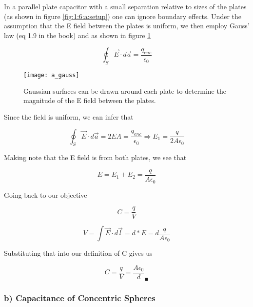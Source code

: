 In a parallel plate capacitor with a small separation relative to
sizes of the plates (as shown in figure \ref{fig:1:6:a:setup}) one can
ignore boundary effects.  Under the assumption that the E field
between the plates is uniform, we then employ Gauss' law (eq 1.9 in
the book) and as shown in figure \ref{fig:1:6:a:gauss}

\begin{equation}
  \oint_S \vec{E} \cdot d\vec{a} = \frac{q_{enc}}{\epsilon_0}
\end{equation}

\begin{figure}
  \begin{center}
    \texttt{[image: a\_gauss]}
    \caption{Gaussian surfaces can be drawn around each plate to
      determine the magnitude of the E field between the plates.}
    \label{fig:1:6:a:gauss}
  \end{center}
\end{figure}

Since the field is uniform, we can infer that

\begin{equation}
  \oint_S \vec{E} \cdot d\vec{a}
  = 2EA
  = \frac{q_{enc}}{\epsilon_0}
  \Rightarrow E_1 = \frac{q}{2A\epsilon_0}
\end{equation}

Making note that the E field is from both plates, we see that

\begin{equation}
E = E_1 + E_2 = \frac{q}{A\epsilon_0}
\end{equation}

Going back to our objective

\begin{equation}
  C = \frac q V
\end{equation}

\begin{equation}
  V
  = \int{\vec{E} \cdot d\vec{l}}
  = d * E
  = d\frac{q}{A\epsilon_0}
\end{equation}

Substituting that into our definition of C gives us

\begin{equation}
  C
  = \frac q V
  = \frac{A\epsilon_0}{d}_\blacksquare
\end{equation}


\subsubsection*{b) Capacitance of Concentric Spheres}

